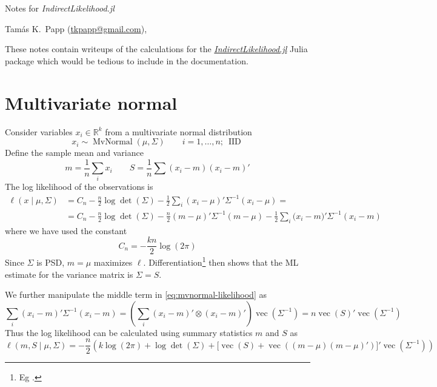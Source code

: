 \documentclass[b5paper,11pt]{article}
\DeclareMathOperator{\mvnormal}{MvNormal}
\DeclareMathOperator{\IID}{IID}
\DeclareMathOperator{\vect}{vec}
\newcommand{\reals}{\mathbb{R}}
\begin{document}
\begin{center}
  {\Large{Notes for \textsl{IndirectLikelihood.jl}}}

  \smallskip

  Tam\'as K.~Papp (\url{tkpapp@gmail.com}), \textsl{\DTMtoday}
\end{center}

These notes contain writeups of the calculations for the \href{https://github.com/tpapp/IndirectLikelihood.jl}{\textsl{IndirectLikelihood.jl}} Julia package which would be tedious to include in the documentation.

\section{Multivariate normal}
\label{sec:multivariate-normal}

Consider variables $x_i \in \reals^k$ from a multivariate normal distribution
\begin{equation}
  x_i \sim \mvnormal(\mu, \Sigma)
  \qquad
  i = 1, \dots, n;\ \IID
\end{equation}
Define the sample mean and variance
\begin{equation}
  m = \frac1n \sum_i x_i
  \qquad
  S = \frac1n \sum (x_i-m)(x_i-m)'
\end{equation}
The log likelihood of the observations is
\begin{align}
  \label{eq:mvnormal-likelihood}
  \ell(x \mid \mu, \Sigma) &= C_n - \frac{n}{2} \log\det(\Sigma) - \frac12 \sum_i (x_i-\mu)'\Sigma^{-1}(x_i-\mu) =\\
              &= C_n - \frac{n}{2} \log\det(\Sigma) - \frac{n}2 (m-\mu)'\Sigma^{-1}(m-\mu)
                - \frac12 \sum_i \bigl(x_i-m)'\Sigma^{-1}(x_i-m)
\end{align}
where we have used the constant
\begin{equation}
  C_n = -\frac{kn}{2} \log(2\pi)
\end{equation}
Since $\Sigma$ is PSD, $m=\mu$ maximizes $\ell$. Differentiation\footnote{Eg \textcite{minka2000old}.} then shows that the ML estimate for the variance matrix is $\Sigma=S$.

We further manipulate the middle term in \eqref{eq:mvnormal-likelihood} as
\begin{equation}
  \sum_i (x_i-m)' \Sigma^{-1} (x_i-m) = \left(\sum_i (x_i-m)'\otimes(x_i-m)'\right) \vect(\Sigma^{-1}) =
  n \vect(S)'\vect(\Sigma^{-1})
\end{equation}
Thus the log likelihood can be calculated using summary statistics $m$ and $S$ as
\begin{equation}
  \ell(m, S \mid \mu, \Sigma) = -\frac{n}{2}\left( k\log(2\pi) + \log\det(\Sigma) +
    \bigl[\vect(S) + \vect((m-\mu)(m-\mu)')\bigr]'\vect(\Sigma^{-1})\right)
\end{equation}

\printbibliography
\end{document}
